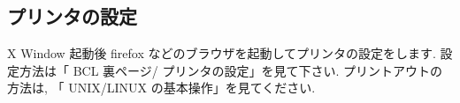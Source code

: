 \documentclass{jarticle}
\begin{document}
%
%

%



\subsection{プリンタの設定}
X Window 起動後 firefox などのブラウザを起動してプリンタの設定をします.
設定方法は「 BCL 裏ページ/ プリンタの設定」を見て下さい.
%
%
プリントアウトの方法は, 「 UNIX/LINUX の基本操作」を見てください.
\end{document}
